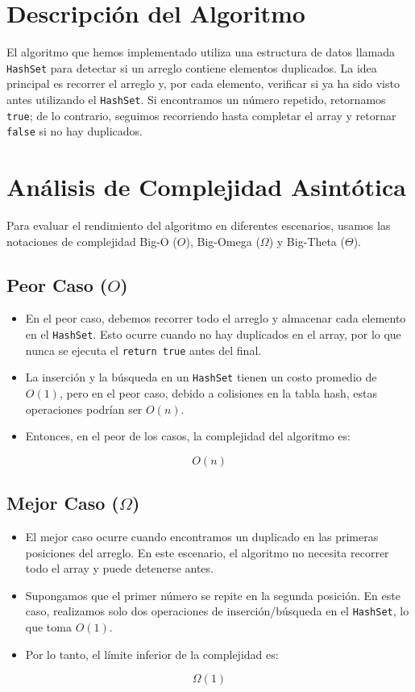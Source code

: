 \documentclass{article}
\begin{document}
	\newpage
	
	
	\section{Descripción del Algoritmo}
	El algoritmo que hemos implementado utiliza una estructura de datos llamada \texttt{HashSet} para detectar si un arreglo contiene elementos duplicados. La idea principal es recorrer el arreglo y, por cada elemento, verificar si ya ha sido visto antes utilizando el \texttt{HashSet}. Si encontramos un número repetido, retornamos \texttt{true}; de lo contrario, seguimos recorriendo hasta completar el array y retornar \texttt{false} si no hay duplicados.
	
	\section{Análisis de Complejidad Asintótica}
	Para evaluar el rendimiento del algoritmo en diferentes escenarios, usamos las notaciones de complejidad Big-O ($O$), Big-Omega ($\Omega$) y Big-Theta ($\Theta$).
	
	\subsection{Peor Caso ($O$)}
	\begin{itemize}
		\item En el peor caso, debemos recorrer todo el arreglo y almacenar cada elemento en el \texttt{HashSet}. Esto ocurre cuando no hay duplicados en el array, por lo que nunca se ejecuta el \texttt{return true} antes del final.
		\item La inserción y la búsqueda en un \texttt{HashSet} tienen un costo promedio de $O(1)$, pero en el peor caso, debido a colisiones en la tabla hash, estas operaciones podrían ser $O(n)$.
		\item Entonces, en el peor de los casos, la complejidad del algoritmo es:
	\end{itemize}
	\begin{equation}
		O(n)
	\end{equation}
	
	\subsection{Mejor Caso ($\Omega$)}
	\begin{itemize}
		\item El mejor caso ocurre cuando encontramos un duplicado en las primeras posiciones del arreglo. En este escenario, el algoritmo no necesita recorrer todo el array y puede detenerse antes.
		\item Supongamos que el primer número se repite en la segunda posición. En este caso, realizamos solo dos operaciones de inserción/búsqueda en el \texttt{HashSet}, lo que toma $O(1)$.
		\item Por lo tanto, el límite inferior de la complejidad es:
	\end{itemize}
	\begin{equation}
		\Omega(1)
	\end{equation}
	
\end{document}
